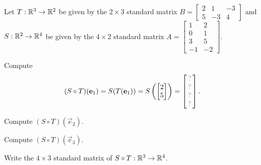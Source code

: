 \begin{activity}{15}
Let $T: \mathbb{R}^3 \rightarrow \mathbb{R}^2$ be given by the \(2\times 3\) standard matrix $B=\begin{bmatrix} 2 & 1 & -3 \\ 5 & -3 & 4 \end{bmatrix}$ and $S: \mathbb{R}^2 \rightarrow \mathbb{R}^4$ be given by the \(4\times 2\) standard matrix $A=\begin{bmatrix} 1 & 2 \\ 0 & 1 \\ 3 & 5 \\ -1 & -2 \end{bmatrix}$.

\begin{subactivity}
Compute
\[
  (S \circ T)(\vec{e}_1)
    =
  S(T(\vec{e}_1))
    =
  S\left(\begin{bmatrix} 2 \\ 5\end{bmatrix}\right)
        =
  \begin{bmatrix}\unknown\\\unknown\\\unknown\\\unknown\end{bmatrix}.
\]

\end{subactivity}
\begin{subactivity}
Compute
\(
  (S \circ T)(\vec{e}_2)
\).
\end{subactivity}
\begin{subactivity}
Compute
\(
  (S \circ T)(\vec{e}_3)
\).
\end{subactivity}
\begin{subactivity}
Write the \(4\times 3\) standard matrix of $S \circ T:\mathbb{R}^3\to\mathbb{R}^4$.
\end{subactivity}
\end{activity}

